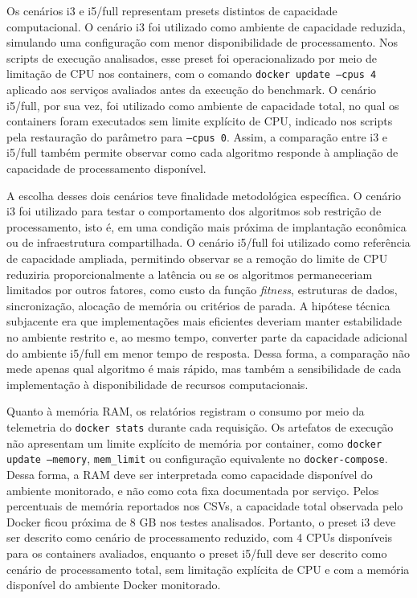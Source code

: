 Os cenários i3 e i5/full representam presets distintos de capacidade computacional. O cenário i3 foi utilizado como ambiente de capacidade reduzida, simulando uma configuração com menor disponibilidade de processamento. Nos scripts de execução analisados, esse preset foi operacionalizado por meio de limitação de CPU nos containers, com o comando \texttt{docker update --cpus 4} aplicado aos serviços avaliados antes da execução do benchmark. O cenário i5/full, por sua vez, foi utilizado como ambiente de capacidade total, no qual os containers foram executados sem limite explícito de CPU, indicado nos scripts pela restauração do parâmetro para \texttt{--cpus 0}. Assim, a comparação entre i3 e i5/full também permite observar como cada algoritmo responde à ampliação de capacidade de processamento disponível.

A escolha desses dois cenários teve finalidade metodológica específica. O cenário i3 foi utilizado para testar o comportamento dos algoritmos sob restrição de processamento, isto é, em uma condição mais próxima de implantação econômica ou de infraestrutura compartilhada. O cenário i5/full foi utilizado como referência de capacidade ampliada, permitindo observar se a remoção do limite de CPU reduziria proporcionalmente a latência ou se os algoritmos permaneceriam limitados por outros fatores, como custo da função \textit{fitness}, estruturas de dados, sincronização, alocação de memória ou critérios de parada. A hipótese técnica subjacente era que implementações mais eficientes deveriam manter estabilidade no ambiente restrito e, ao mesmo tempo, converter parte da capacidade adicional do ambiente i5/full em menor tempo de resposta. Dessa forma, a comparação não mede apenas qual algoritmo é mais rápido, mas também a sensibilidade de cada implementação à disponibilidade de recursos computacionais.

Quanto à memória RAM, os relatórios registram o consumo por meio da telemetria do \texttt{docker stats} durante cada requisição. Os artefatos de execução não apresentam um limite explícito de memória por container, como \texttt{docker update --memory}, \texttt{mem\_limit} ou configuração equivalente no \texttt{docker-compose}. Dessa forma, a RAM deve ser interpretada como capacidade disponível do ambiente monitorado, e não como cota fixa documentada por serviço. Pelos percentuais de memória reportados nos CSVs, a capacidade total observada pelo Docker ficou próxima de 8 GB nos testes analisados. Portanto, o preset i3 deve ser descrito como cenário de processamento reduzido, com 4 CPUs disponíveis para os containers avaliados, enquanto o preset i5/full deve ser descrito como cenário de processamento total, sem limitação explícita de CPU e com a memória disponível do ambiente Docker monitorado.

